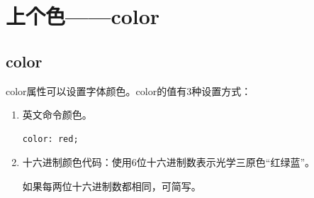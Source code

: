 \newpage

\section{上个色——color}

\subsection{color}

color属性可以设置字体颜色。color的值有3种设置方式：

\begin{enumerate}
	\item 英文命令颜色。\\
	      \begin{lstlisting}[style=htmlcssjs]
color: red;
    \end{lstlisting}

	\item 十六进制颜色代码：使用6位十六进制数表示光学三原色“红绿蓝”。
	      \begin{table}[H]
		      \centering
		      \caption{颜色代码}
	      \end{table}
	      如果每两位十六进制数都相同，可简写。
	      \begin{table}[H]
		      \centering
		      \caption{常见颜色代码}
	      \end{table}


\end{enumerate}
